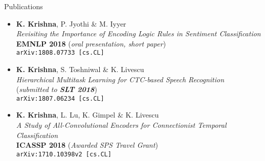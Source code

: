 \documentclass{resume} %
\begin{document}
\vspace*{-1.5mm}
\begin{rSection}{Publications}
\begin{itemize}[leftmargin=*]
\item \textbf{K. Krishna}, P. Jyothi \& M. Iyyer\\\textit{Revisiting the Importance of Encoding Logic Rules in Sentiment Classification}\\ \textbf{EMNLP 2018} (\textit{oral presentation, short paper}) \\
\texttt{arXiv:1808.07733 [cs.CL]}
\item \textbf{K. Krishna}, S. Toshniwal \& K. Livescu\\\textit{Hierarchical Multitask Learning for CTC-based Speech Recognition}\\ (\textit{submitted to \textbf{SLT 2018}}) \\ \texttt{arXiv:1807.06234 [cs.CL]} 
\item \textbf{K. Krishna}, L. Lu, K. Gimpel \&  K. Livescu\\\textit{A Study of All-Convolutional Encoders for Connectionist Temporal Classification}\\ \textbf{ICASSP 2018} (\textit{Awarded SPS Travel Grant}) \\ \texttt{arXiv:1710.10398v2 [cs.CL]} 
\end{itemize}
\end{rSection}
\vspace*{-1.5mm}
\end{document}
